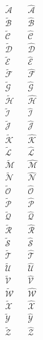 \begin{align*}
  \tilde{\mathcal{A}} && \hat{\mathcal{A}} \\
  \tilde{\mathcal{B}} && \hat{\mathcal{B}} \\
  \tilde{\mathcal{C}} && \hat{\mathcal{C}} \\
  \tilde{\mathcal{D}} && \hat{\mathcal{D}} \\
  \tilde{\mathcal{E}} && \hat{\mathcal{E}} \\
  \tilde{\mathcal{F}} && \hat{\mathcal{F}} \\
  \tilde{\mathcal{G}} && \hat{\mathcal{G}} \\
  \tilde{\mathcal{H}} && \hat{\mathcal{H}} \\
  \tilde{\mathcal{I}} && \hat{\mathcal{I}} \\
  \tilde{\mathcal{J}} && \hat{\mathcal{J}} \\
  \tilde{\mathcal{K}} && \hat{\mathcal{K}} \\
  \tilde{\mathcal{L}} && \hat{\mathcal{L}} \\
  \tilde{\mathcal{M}} && \hat{\mathcal{M}} \\
  \tilde{\mathcal{N}} && \hat{\mathcal{N}} \\
  \tilde{\mathcal{O}} && \hat{\mathcal{O}} \\
  \tilde{\mathcal{P}} && \hat{\mathcal{P}} \\
  \tilde{\mathcal{Q}} && \hat{\mathcal{Q}} \\
  \tilde{\mathcal{R}} && \hat{\mathcal{R}} \\
  \tilde{\mathcal{S}} && \hat{\mathcal{S}} \\
  \tilde{\mathcal{T}} && \hat{\mathcal{T}} \\
  \tilde{\mathcal{U}} && \hat{\mathcal{U}} \\
  \tilde{\mathcal{V}} && \hat{\mathcal{V}} \\
  \tilde{\mathcal{W}} && \hat{\mathcal{W}} \\
  \tilde{\mathcal{X}} && \hat{\mathcal{X}} \\
  \tilde{\mathcal{Y}} && \hat{\mathcal{Y}} \\
  \tilde{\mathcal{Z}} && \hat{\mathcal{Z}}
\end{align*}

